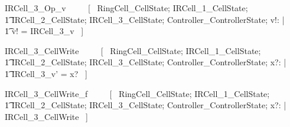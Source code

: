 \documentclass{article}
\begin{document}
\begin{zed}
IRCell\_3\_Op\_v ~~~~ [~ 
    \Xi RingCell\_CellState; 
    \Xi IRCell\_1\_CellState; \\
    \t1 \Xi IRCell\_2\_CellState; 
    \Xi IRCell\_3\_CellState;
    \Xi Controller\_ControllerState; v!: \nat | \\
    \t1 v! = IRCell\_3\_v ~] \\
\end{zed}

\begin{zed}
IRCell\_3\_CellWrite ~~~~ [~ 
    \Xi RingCell\_CellState; 
    \Xi IRCell\_1\_CellState; \\
    \t1 \Xi IRCell\_2\_CellState; 
    \Delta IRCell\_3\_CellState;
    \Xi Controller\_ControllerState; 
    x?: \nat | \\
    \t1 IRCell\_3\_v' = x? ~] \\
\end{zed}

\begin{zed}
IRCell\_3\_CellWrite\_f ~~~~ [~ 
    \Xi RingCell\_CellState; 
    \Xi IRCell\_1\_CellState; \\
    \t1 \Xi IRCell\_2\_CellState; 
    \Xi IRCell\_3\_CellState;
    \Xi Controller\_ControllerState; 
    x?: \nat | \\
    \lnot \pre IRCell\_3\_CellWrite ~] \\
\end{zed}
\end{document}
